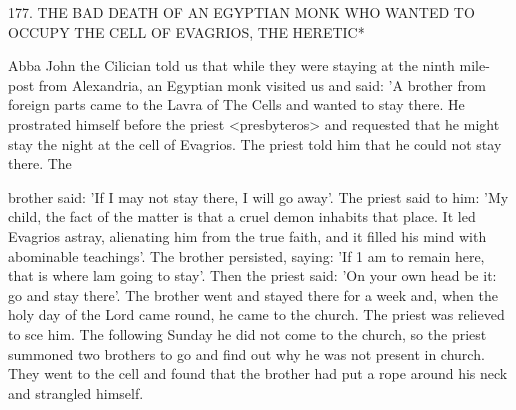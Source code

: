 177. THE BAD DEATH OF AN EGYPTIAN MONK
WHO WANTED TO OCCUPY THE CELL
OF EVAGRIOS, THE HERETIC*

Abba John the Cilician told us that while they were staying at the
ninth mile-post from Alexandria, an Egyptian monk visited us and
said: 'A brother from foreign parts came to the Lavra of The Cells
and wanted to stay there. He prostrated himself before the priest
<presbyteros> and requested that he might stay the night at the cell
of Evagrios. The priest told him that he could not stay there. The

brother said: 'If I may not stay there, I will go away'. The priest
said to him: 'My child, the fact of the matter is that a cruel demon
inhabits that place. It led Evagrios astray, alienating him from the
true faith, and it filled his mind with abominable teachings'. The
brother persisted, saying: 'If 1 am to remain here, that is where lam
going to stay'. Then the priest said: 'On your own head be it: go
and stay there'. The brother went and stayed there for a week and,
when the holy day of the Lord came round, he came to the church.
The priest was relieved to sce him. The following Sunday he did not
come to the church, so the priest summoned two brothers to go and
find out why he was not present in church. They went to the cell
and found that the brother had put a rope around his neck and
strangled himself.

